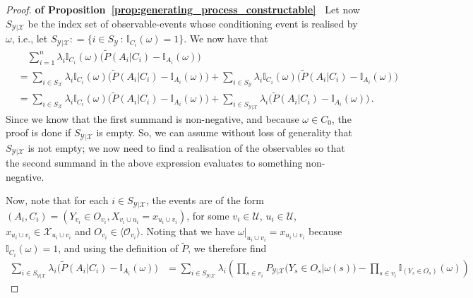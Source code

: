 \documentclass[twoside,11pt]{article}
\newcommand{\states}{\mathcal{X}}
\newcommand{\observs}{\mathcal{Y}}
\newcommand{\ind}[1]{\mathbb{I}_{#1}}
\newcommand{\coloneqq}{:\!=}
\begin{document}
\begin{proof}{\bf of Proposition~\ref{prop:generating_process_constructable}~}
Let now $S_{\observs\vert\states}$ be the index set of observable-events whose conditioning event is realised by $\omega$, i.e., let $S_{\observs\vert\states}\coloneqq \bigl\{ i\in S_\observs\,:\, \ind{C_i}(\omega) = 1\bigr\}$. We now have that
\begin{align*}
 &\quad \sum_{i=1}^n\lambda_i\ind{C_i}(\omega)\bigl(\tilde{P}(A_i\vert C_i) - \ind{A_i}(\omega)\bigr) \\
 &= \sum_{i\in S_\states}\lambda_i\ind{C_i}(\omega)\bigl(\tilde{P}(A_i\vert C_i) - \ind{A_i}(\omega)\bigr) + \sum_{i\in S_\observs}\lambda_i\ind{C_i}(\omega)\bigl(\tilde{P}(A_i\vert C_i) - \ind{A_i}(\omega)\bigr) \\
 &= \sum_{i\in S_\states}\lambda_i\ind{C_i}(\omega)\bigl(\tilde{P}(A_i\vert C_i) - \ind{A_i}(\omega)\bigr) + \sum_{i\in S_{\observs\vert\states}}\lambda_i\bigl(\tilde{P}(A_i\vert C_i) - \ind{A_i}(\omega)\bigr)\,.
\end{align*}
Since we know that the first summand is non-negative, and because $\omega\in C_0$, the proof is done if $S_{\observs\vert\states}$ is empty. So, we can assume without loss of generality that $S_{\observs\vert\states}$ is not empty; we now need to find a realisation of the observables so that the second summand in the above expression evaluates to something non-negative.

Now, note that for each $i\in S_{\observs\vert\states}$, the events are of the form $(A_i,C_i)=(Y_{v_i}\in O_{v_i}, X_{v_i\cup u_i}=x_{u_i\cup v_i})$, for some $v_i\in\mathcal{U}$, $u_i\in\mathcal{U}$, $x_{u_i\cup v_i}\in\states_{u_i\cup v_i}$ and $O_{v_i}\in \langle\mathcal{O}_{v_i}\rangle$. Noting that we have $\omega\vert_{u_i\cup v_i}=x_{u_i\cup v_i}$ because $\ind{C_i}(\omega)=1$, and using the definition of $\tilde{P}$, we therefore find
\begin{align*}
\sum_{i\in S_{\observs\vert\states}}\lambda_i\bigl(\tilde{P}(A_i\vert C_i) - \ind{A_i}(\omega)\bigr) &= \sum_{i\in S_{\observs\vert\states}}\lambda_i\left(\prod_{s\in v_i}P_{\observs\vert\states}\bigl(Y_s\in O_s\vert \omega(s)\bigr) - \prod_{s\in v_i}\ind{(Y_s\in O_s)}(\omega)\right)
\end{align*}


\end{proof}
\end{document}
